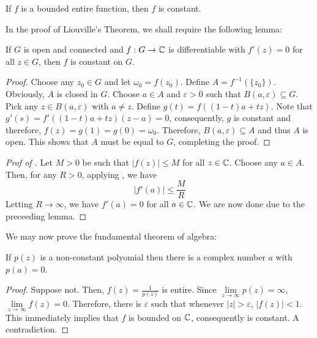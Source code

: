 \begin{theorem}[Liouville]
    If $f$ is a bounded entire function, then $f$ is constant.
\end{theorem}

In the proof of Liouville's Theorem, we shall require the following lemma:
\begin{lemma}
    If $G$ is open and connected and $f: G\to\mathbb{C}$ is differentiable with $f'(z) = 0$ for all $z\in G$, then $f$ is constant on $G$.
\end{lemma}
\begin{proof}
    Choose any $z_0\in G$ and let $\omega_0 = f(z_0)$. Define $A = f^{-1}(\{z_0\})$. Obviously, $A$ is closed in $G$. Choose $a\in A$ and $\varepsilon > 0$ such that $B(a,\varepsilon)\subseteq G$. Pick any $z\in B(a,\varepsilon)$ with $a\ne z$. Define $g(t) = f((1 - t)a + tz)$. Note that $g'(s) = f'((1-t)a + tz)(z - a) = 0$, consequently, $g$ is constant and therefore, $f(z) = g(1) = g(0) = \omega_0$. Therefore, $B(a,\varepsilon)\subseteq A$ and thus $A$ is open. This shows that $A$ must be equal to $G$, completing the proof.
\end{proof}

\begin{proof}[Prof of ]
    Let $M > 0$ be such that $|f(z)|\le M$ for all $z\in\mathbb{C}$. Choose any $a\in A$. Then, for any $R > 0$, applying , we have 
    \begin{equation*}
        |f'(a)|\le\frac{M}{R}
    \end{equation*}
    Letting $R\to\infty$, we have $f'(a) = 0$ for all $a\in\mathbb{C}$. We are now done due to the preceeding lemma.
\end{proof}

We may now prove the fundamental theorem of algebra: 

\begin{theorem}
    If $p(z)$ is a non-constant polyomial then there is a complex number $a$ with $p(a) = 0$.
\end{theorem}
\begin{proof}
    Suppose not. Then, $f(z) = \frac{1}{p(z)}$ is entire. Since $\lim\limits_{z\to\infty} p(z) = \infty$, $\lim\limits_{z\to\infty} f(z) = 0$. Therefore, there is $\varepsilon$ such that whenever $|z| > \varepsilon$, $|f(z)| < 1$. This immediately implies that $f$ is bounded on $\mathbb{C}$, consequently is constant. A contradiction.
\end{proof}

